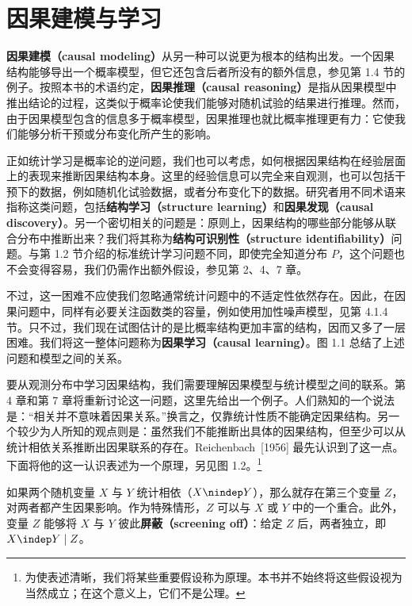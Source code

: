 \FloatBarrier
\section{因果建模与学习}
\label{sec:causal-modeling-learning}

\textbf{因果建模（causal modeling）}从另一种可以说更为根本的结构出发。一个因果结构能够导出一个概率模型，但它还包含后者所没有的额外信息，参见第 1.4 节的例子。按照本书的术语约定，\textbf{因果推理（causal reasoning）}是指从因果模型中推出结论的过程，这类似于概率论使我们能够对随机试验的结果进行推理。然而，由于因果模型包含的信息多于概率模型，因果推理也就比概率推理更有力：它使我们能够分析干预或分布变化所产生的影响。

正如统计学习是概率论的逆问题，我们也可以考虑，如何根据因果结构在经验层面上的表现来推断因果结构本身。这里的经验信息可以完全来自观测，也可以包括干预下的数据，例如随机化试验数据，或者分布变化下的数据。研究者用不同术语来指称这类问题，包括\textbf{结构学习（structure learning）}和\textbf{因果发现（causal discovery）}。另一个密切相关的问题是：原则上，因果结构的哪些部分能够从联合分布中推断出来？我们将其称为\textbf{结构可识别性（structure identifiability）}问题。与第 1.2 节介绍的标准统计学习问题不同，即使完全知道分布 $P$，这个问题也不会变得容易，我们仍需作出额外假设，参见第 2、4、7 章。



不过，这一困难不应使我们忽略通常统计问题中的不适定性依然存在。因此，在因果问题中，同样有必要关注函数类的容量，例如使用加性噪声模型，见第 4.1.4 节。只不过，我们现在试图估计的是比概率结构更加丰富的结构，因而又多了一层困难。我们将这一整体问题称为\textbf{因果学习（causal learning）}。图 1.1 总结了上述问题和模型之间的关系。

要从观测分布中学习因果结构，我们需要理解因果模型与统计模型之间的联系。第 4 章和第 7 章将重新讨论这一问题，这里先给出一个例子。人们熟知的一个说法是：“相关并不意味着因果关系。”换言之，仅靠统计性质不能确定因果结构。另一个较少为人所知的观点则是：虽然我们不能推断出具体的因果结构，但至少可以从统计相依关系推断出因果联系的存在。Reichenbach~[1956] 最先认识到了这一点。下面将他的这一认识表述为一个原理，另见图 1.2。\footnote{为使表述清晰，我们将某些重要假设称为原理。本书并不始终将这些假设视为当然成立；在这个意义上，它们不是公理。}



\begin{principle}
\label{principle:1.1}
如果两个随机变量 $X$ 与 $Y$ 统计相依（$X\nindep Y$），那么就存在第三个变量 $Z$，对两者都产生因果影响。作为特殊情形，$Z$ 可以与 $X$ 或 $Y$ 中的一个重合。此外，变量 $Z$ 能够将 $X$ 与 $Y$ 彼此\textbf{屏蔽（screening off）}：给定 $Z$ 后，两者独立，即 $X\indep Y\mid Z$。
\end{principle}

